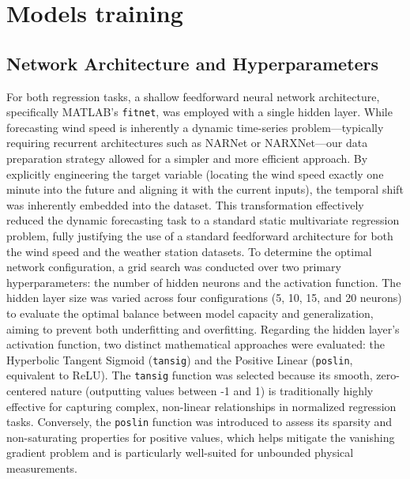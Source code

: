 \documentclass[conference]{IEEEtran}
\begin{document}
\section{Models training}
\subsection{Network Architecture and Hyperparameters}
For both regression tasks, a shallow feedforward neural network architecture, specifically MATLAB's \texttt{fitnet}, was employed with a single hidden layer. While forecasting wind speed is inherently a dynamic time-series problem---typically requiring recurrent architectures such as NARNet or NARXNet---our data preparation strategy allowed for a simpler and more efficient approach. By explicitly engineering the target variable (locating the wind speed exactly one minute into the future and aligning it with the current inputs), the temporal shift was inherently embedded into the dataset. This transformation effectively reduced the dynamic forecasting task to a standard static multivariate regression problem, fully justifying the use of a standard feedforward architecture for both the wind speed and the weather station datasets.
To determine the optimal network configuration, a grid search was conducted over two primary hyperparameters: the number of hidden neurons and the activation function. The hidden layer size was varied across four configurations (5, 10, 15, and 20 neurons) to evaluate the optimal balance between model capacity and generalization, aiming to prevent both underfitting and overfitting.
Regarding the hidden layer's activation function, two distinct mathematical approaches were evaluated: the Hyperbolic Tangent Sigmoid (\texttt{tansig}) and the Positive Linear (\texttt{poslin}, equivalent to ReLU). The \texttt{tansig} function was selected because its smooth, zero-centered nature (outputting values between -1 and 1) is traditionally highly effective for capturing complex, non-linear relationships in normalized regression tasks. Conversely, the \texttt{poslin} function was introduced to assess its sparsity and non-saturating properties for positive values, which helps mitigate the vanishing gradient problem and is particularly well-suited for unbounded physical measurements.
\end{document}
